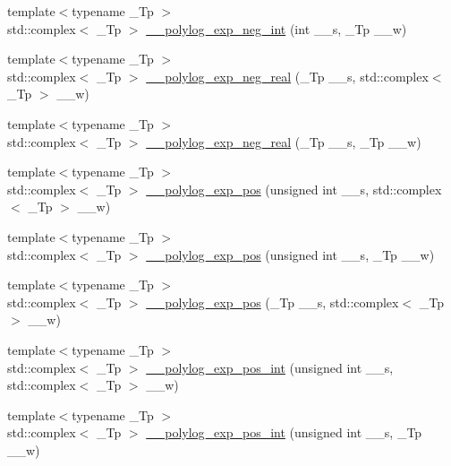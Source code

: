 \begin{DoxyCompactItemize}
\item 
{\footnotesize template$<$typename \+\_\+\+Tp $>$ }\\std\+::complex$<$ \+\_\+\+Tp $>$ \hyperlink{namespacestd_1_1____detail_a7a186c84c1673a2beabba25c91119c66}{\+\_\+\+\_\+polylog\+\_\+exp\+\_\+neg\+\_\+int} (int \+\_\+\+\_\+s, \+\_\+\+Tp \+\_\+\+\_\+w)
\item 
{\footnotesize template$<$typename \+\_\+\+Tp $>$ }\\std\+::complex$<$ \+\_\+\+Tp $>$ \hyperlink{namespacestd_1_1____detail_a6320926219e1a9a653d9a793c7a3ad37}{\+\_\+\+\_\+polylog\+\_\+exp\+\_\+neg\+\_\+real} (\+\_\+\+Tp \+\_\+\+\_\+s, std\+::complex$<$ \+\_\+\+Tp $>$ \+\_\+\+\_\+w)
\item 
{\footnotesize template$<$typename \+\_\+\+Tp $>$ }\\std\+::complex$<$ \+\_\+\+Tp $>$ \hyperlink{namespacestd_1_1____detail_a65df07847bbb3c92518449fbc5787870}{\+\_\+\+\_\+polylog\+\_\+exp\+\_\+neg\+\_\+real} (\+\_\+\+Tp \+\_\+\+\_\+s, \+\_\+\+Tp \+\_\+\+\_\+w)
\item 
{\footnotesize template$<$typename \+\_\+\+Tp $>$ }\\std\+::complex$<$ \+\_\+\+Tp $>$ \hyperlink{namespacestd_1_1____detail_a0327d2970eba3a0a2d73c71c7a77701c}{\+\_\+\+\_\+polylog\+\_\+exp\+\_\+pos} (unsigned int \+\_\+\+\_\+s, std\+::complex$<$ \+\_\+\+Tp $>$ \+\_\+\+\_\+w)
\item 
{\footnotesize template$<$typename \+\_\+\+Tp $>$ }\\std\+::complex$<$ \+\_\+\+Tp $>$ \hyperlink{namespacestd_1_1____detail_ab13a4be6685dd222b654da3297342d7e}{\+\_\+\+\_\+polylog\+\_\+exp\+\_\+pos} (unsigned int \+\_\+\+\_\+s, \+\_\+\+Tp \+\_\+\+\_\+w)
\item 
{\footnotesize template$<$typename \+\_\+\+Tp $>$ }\\std\+::complex$<$ \+\_\+\+Tp $>$ \hyperlink{namespacestd_1_1____detail_a56b0f5bc6f4955469fd5f83105cbd466}{\+\_\+\+\_\+polylog\+\_\+exp\+\_\+pos} (\+\_\+\+Tp \+\_\+\+\_\+s, std\+::complex$<$ \+\_\+\+Tp $>$ \+\_\+\+\_\+w)
\item 
{\footnotesize template$<$typename \+\_\+\+Tp $>$ }\\std\+::complex$<$ \+\_\+\+Tp $>$ \hyperlink{namespacestd_1_1____detail_a84081b0dd494f4601f2d40768e71b7b4}{\+\_\+\+\_\+polylog\+\_\+exp\+\_\+pos\+\_\+int} (unsigned int \+\_\+\+\_\+s, std\+::complex$<$ \+\_\+\+Tp $>$ \+\_\+\+\_\+w)
\item 
{\footnotesize template$<$typename \+\_\+\+Tp $>$ }\\std\+::complex$<$ \+\_\+\+Tp $>$ \hyperlink{namespacestd_1_1____detail_a6d05f9213f03b1781250cc048739e55b}{\+\_\+\+\_\+polylog\+\_\+exp\+\_\+pos\+\_\+int} (unsigned int \+\_\+\+\_\+s, \+\_\+\+Tp \+\_\+\+\_\+w)

\end{DoxyCompactItemize}
